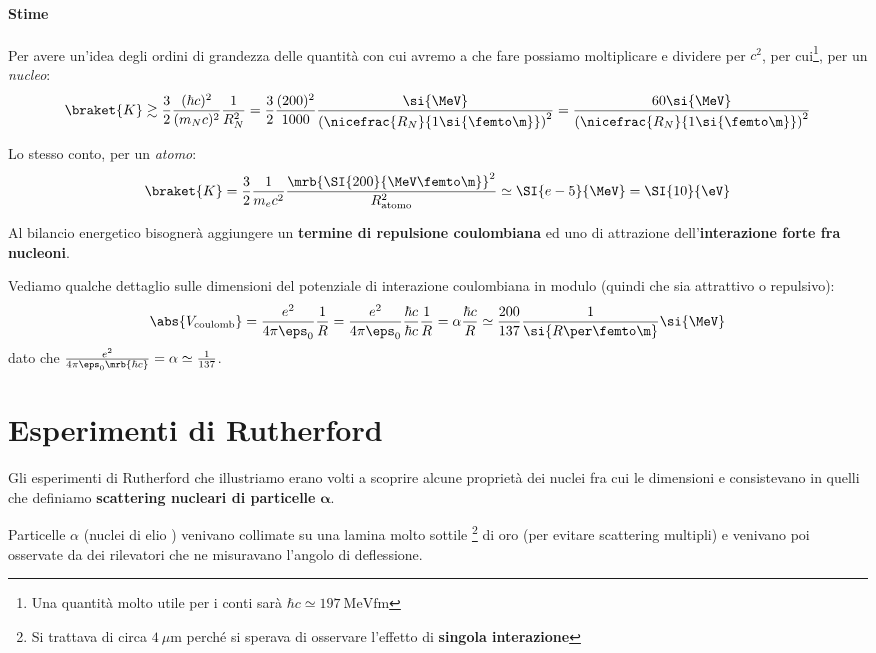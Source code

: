 \paragraph{Stime}
Per avere un'idea degli ordini di grandezza delle quantità con cui avremo a che
fare possiamo moltiplicare e
dividere per $c^2$, per cui\footnote{
  Una quantità molto utile per i conti sarà $\hbar c \simeq \SI{197}{\MeV
  \femto\m}$
}, per un \textit{nucleo}:
\begin{equation}
  \braket{K} \gtrsim \frac{3}{2}\frac{(\hbar c)^2}{(m_N c)^2}\frac{1}{R_N^2} =
  \frac{3}{2}\frac{(200)^2}{1000}
  \frac{\si{\MeV}}{\left(\nicefrac{R_N}{1\si{\femto\m}}\right)^2} =
  \frac{60\si{\MeV}} {\left(\nicefrac{R_N}{1\si{\femto\m}}\right)^2}
\end{equation}

Lo stesso conto, per un \textit{atomo}:
\begin{equation}
  \braket{K} = \frac{3}{2} \frac{1}{m_e c^2} \frac{\mrb{\SI{200}{\MeV
  \femto\m}}^{2}}{R_\text{atomo}^{2}} \simeq \SI{e-5}{\MeV} = \SI{10}{\eV}
\end{equation}

\begin{note}[]
  Al bilancio energetico bisognerà aggiungere un \textbf{termine di repulsione
  coulombiana} ed uno di attrazione dell'\textbf{interazione forte fra
  nucleoni}.
\end{note}

\begin{note}
  Vediamo qualche dettaglio sulle dimensioni del potenziale di interazione
  coulombiana in modulo (quindi che sia attrattivo o repulsivo):
  \begin{equation}
    \abs{V_\text{coulomb}} = \frac{e^2}{4 \pi \eps_0} \frac{1}{R} =
    \frac{e^2}{4 \pi \eps_0} \frac{\hbar c}{\hbar c} \frac{1}{R} = \alpha
    \frac{\hbar c}{R} \simeq \frac{200}{137} \frac{1}{\si{R \per \femto\m}}
    \si{\MeV}
  \end{equation}
  dato che $\frac{e^2}{4 \pi \eps_0 \mrb{\hbar c}} = \alpha \simeq
  \frac{1}{137}$.
\end{note}

\section{Esperimenti di Rutherford}
\label{sec:rutherford}
Gli esperimenti di Rutherford che illustriamo erano volti a scoprire alcune
proprietà dei nuclei fra cui le dimensioni e consistevano in quelli che
definiamo \textbf{scattering nucleari di particelle} $\boldsymbol{\alpha}$.\par
Particelle $\alpha$ (nuclei di elio ) venivano collimate su una lamina
molto sottile \footnote{
  Si trattava di circa $\SI{4}{\mu\m}$ perché si sperava di osservare
  l'effetto di \textbf{singola interazione}
} di oro (per evitare scattering multipli) e venivano poi osservate
da dei rilevatori che ne misuravano l'angolo di deflessione.

